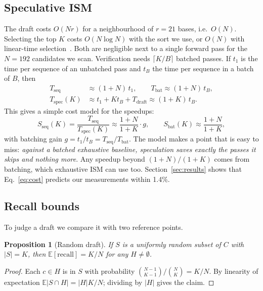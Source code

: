 \documentclass[conference]{IEEEtran}
\newtheorem{proposition}{Proposition}
\begin{document}
\subsection{Speculative ISM}
The draft costs $O(Nr)$ for a neighbourhood of $r=21$ bases, i.e.\ $O(N)$. Selecting the top $K$ costs $O(N\log N)$ with the sort we use, or $O(N)$ with linear-time selection~\cite{blum1973select,cormen2022clrs}. Both are negligible next to a single forward pass for the $N=192$ candidates we scan. Verification needs $\lceil K/B\rceil$ batched passes. If $t_1$ is the time per sequence of an unbatched pass and $t_B$ the time per sequence in a batch of $B$, then
\begin{align}
T_{\mathrm{seq}} &\approx (1+N)\,t_1, \qquad T_{\mathrm{bat}} \approx (1+N)\,t_B,\\
T_{\mathrm{spec}}(K) &\approx t_1 + K t_B + T_{\mathrm{draft}} \approx (1+K)\,t_B.
\end{align}
This gives a simple cost model for the speedups:
\begin{equation}
S_{\mathrm{seq}}(K)=\frac{T_{\mathrm{seq}}}{T_{\mathrm{spec}}(K)}\approx\frac{1+N}{1+K}\cdot g,\qquad S_{\mathrm{bat}}(K)\approx\frac{1+N}{1+K},
\label{eq:cost}
\end{equation}
with batching gain $g=t_1/t_B=T_{\mathrm{seq}}/T_{\mathrm{bat}}$. The model makes a point that is easy to miss: \emph{against a batched exhaustive baseline, speculation saves exactly the passes it skips and nothing more}. Any speedup beyond $(1+N)/(1+K)$ comes from batching, which exhaustive ISM can use too. Section~\ref{sec:results} shows that Eq.~\eqref{eq:cost} predicts our measurements within 1.4\%.

\subsection{Recall bounds}
To judge a draft we compare it with two reference points.

\begin{proposition}[Random draft]\label{prop:random}
If $S$ is a uniformly random subset of $C$ with $|S|=K$, then $\mathbb{E}[\mathrm{recall}]=K/N$ for any $H\neq\emptyset$.
\end{proposition}
\begin{proof}
Each $c\in H$ is in $S$ with probability $\binom{N-1}{K-1}/\binom{N}{K}=K/N$. By linearity of expectation $\mathbb{E}|S\cap H|=|H|K/N$; dividing by $|H|$ gives the claim.
\end{proof}
\end{document}
